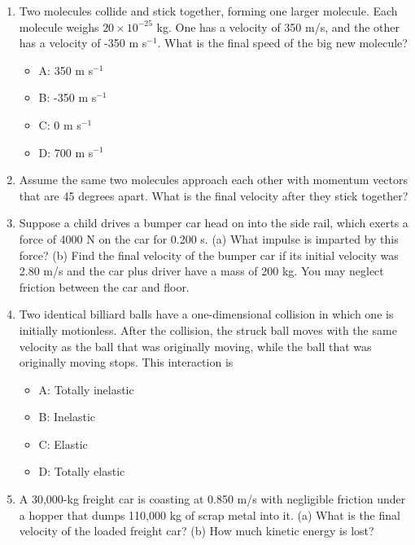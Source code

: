 \documentclass[10pt]{article}
\begin{document}
\begin{enumerate}
\item Two molecules collide and stick together, forming one larger molecule. Each molecule weighs $20 \times 10^{-25}$ kg.  One has a velocity of 350 m/s, and the other has a velocity of -350 m s$^{-1}$.  What is the final speed of the big new molecule?
\begin{itemize}
\item A: 350 m s$^{-1}$
\item B: -350 m s$^{-1}$
\item C: 0 m s$^{-1}$
\item D: 700 m s$^{-1}$
\end{itemize}
\item Assume the same two molecules approach each other with momentum vectors that are 45 degrees apart.  What is the final velocity after they stick together? \\ \vspace{2.5cm}
\item Suppose a child drives a bumper car head on into the side rail, which exerts a force of 4000 N on the car for 0.200 s. (a) What impulse is imparted by this force? (b) Find the final velocity of the bumper car if its initial velocity was 2.80 m/s and the car plus driver have a mass of 200 kg. You may neglect friction between the car and floor. \\ \vspace{2.5cm}
\item  Two identical billiard balls have a one-dimensional collision in which one is initially motionless. After the collision, the struck ball moves with the same velocity as the ball that was originally moving, while the ball that was originally moving stops.  This interaction is
\begin{itemize}
\item A: Totally inelastic
\item B: Inelastic
\item C: Elastic
\item D: Totally elastic
\end{itemize}
\item A 30,000-kg freight car is coasting at 0.850 m/s with negligible friction under a hopper that dumps 110,000 kg of scrap metal into it. (a) What is the final velocity of the loaded freight car? (b) How much kinetic energy is lost? \\ \vspace{2cm}
\end{enumerate}
\end{document}
